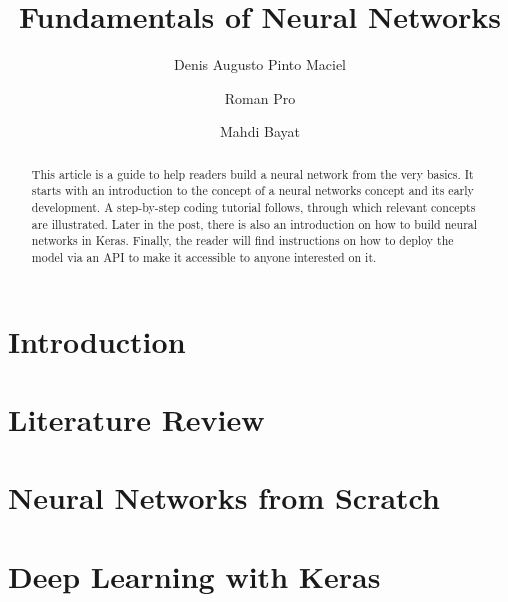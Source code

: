 \documentclass[a4paper, 11pt]{article}
\begin{document}
\title{Fundamentals of Neural Networks}

\author[1]{Denis Augusto Pinto Maciel}
\author[1]{Roman Pro}
\author[1]{Mahdi Bayat}


\maketitle

\begin{abstract}
This article is a guide to help readers build a neural network from the very basics. It starts with an introduction to the concept of a neural networks concept and its early development. A step-by-step coding tutorial follows, through which relevant concepts are illustrated. Later in the post, there is also an introduction on how to build neural networks in Keras. Finally, the reader will find instructions on how to deploy the model via an API to make it accessible to anyone interested on it.
\end{abstract}

\section{Introduction}
\label{sec:intro}


\section{Literature Review}


\section{Neural Networks from Scratch}
\label{sec:nn-from-scratch}



\section{Deep Learning with Keras}
\label{sec:keras}


% 

\printbibliography
\end{document}
